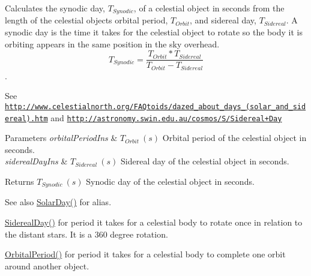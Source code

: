 Calculates the synodic day, $T_{Synodic}$, of a celestial object in seconds from the length of the celestial object\textquotesingle{}s orbital period, $T_{Orbit}$, and sidereal day, $T_{Sidereal}$. A synodic day is the time it takes for the celestial object to rotate so the body it is orbiting appears in the same position in the sky overhead. \[ T_{Synodic}=\dfrac{T_{Orbit} * T_{Sidereal}}{T_{Orbit} - T_{Sidereal}}\]. 

See \href{http://www.celestialnorth.org/FAQtoids/dazed_about_days_(solar_and_sidereal).htm}{\tt http\+://www.\+celestialnorth.\+org/\+F\+A\+Qtoids/dazed\+\_\+about\+\_\+days\+\_\+(solar\+\_\+and\+\_\+sidereal).\+htm} and \href{http://astronomy.swin.edu.au/cosmos/S/Sidereal+Day}{\tt http\+://astronomy.\+swin.\+edu.\+au/cosmos/\+S/\+Sidereal+\+Day}


\begin{DoxyParams}{Parameters}
{\em orbital\+Period\+Ins} & $ T_{Orbit}\ (s)$ Orbital period of the celestial object in seconds. \\
\hline
{\em sidereal\+Day\+Ins} & $ T_{Sidereal}\ (s)$ Sidereal day of the celestial object in seconds. \\
\hline
\end{DoxyParams}
\begin{DoxyReturn}{Returns}
$ T_{Synodic}\ (s)$ Synodic day of the celestial object in seconds. 
\end{DoxyReturn}
\begin{DoxySeeAlso}{See also}
\mbox{\hyperlink{group___e_g_x_phys-_astrophysic-_solar_day_gae321e0dd0c031a57c45b15dc819635e0}{Solar\+Day()}} for alias. 

\mbox{\hyperlink{group___e_g_x_phys-_astrophysic-_sidereal_day_ga587900d5fc755228c1bb5121cd7965c6}{Sidereal\+Day()}} for period it takes for a celestial body to rotate once in relation to the distant stars. It is a 360 degree rotation. 

\mbox{\hyperlink{group___e_g_x_phys-_astrophysic-_orbital_period_ga76aac7afe3b7a30a785259e9eeb0c139}{Orbital\+Period()}} for period it takes for a celestial body to complete one orbit around another object. 
\end{DoxySeeAlso}
